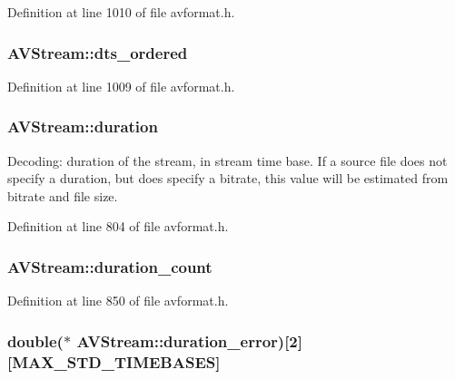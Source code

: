 Definition at line 1010 of file avformat.\+h.

\subsubsection[{\texorpdfstring{dts\+\_\+ordered}{dts_ordered}}]{ A\+V\+Stream\+::dts\+\_\+ordered}\hypertarget{struct_a_v_stream_a936ec7b1aa699303d20e4489ad4054e3}{}\label{struct_a_v_stream_a936ec7b1aa699303d20e4489ad4054e3}


Definition at line 1009 of file avformat.\+h.

\subsubsection[{\texorpdfstring{duration}{duration}}]{ A\+V\+Stream\+::duration}\hypertarget{struct_a_v_stream_a4e04af7a5a4d8298649850df798dd0bc}{}\label{struct_a_v_stream_a4e04af7a5a4d8298649850df798dd0bc}
Decoding\+: duration of the stream, in stream time base. If a source file does not specify a duration, but does specify a bitrate, this value will be estimated from bitrate and file size. 

Definition at line 804 of file avformat.\+h.

\subsubsection[{\texorpdfstring{duration\+\_\+count}{duration_count}}]{ A\+V\+Stream\+::duration\+\_\+count}\hypertarget{struct_a_v_stream_ab1dc61f4f5b3bd8e1211c022aa04d588}{}\label{struct_a_v_stream_ab1dc61f4f5b3bd8e1211c022aa04d588}


Definition at line 850 of file avformat.\+h.

\subsubsection[{\texorpdfstring{duration\+\_\+error}{duration_error}}]{\setlength{\rightskip}{0pt plus 5cm}double($\ast$ A\+V\+Stream\+::duration\+\_\+error)\mbox{[}2\mbox{]}\mbox{[}{\bf M\+A\+X\+\_\+\+S\+T\+D\+\_\+\+T\+I\+M\+E\+B\+A\+S\+ES}\mbox{]}}\hypertarget{struct_a_v_stream_a5364ec3acec412b24d225152cf1c0fd6}{}\label{struct_a_v_stream_a5364ec3acec412b24d225152cf1c0fd6}


